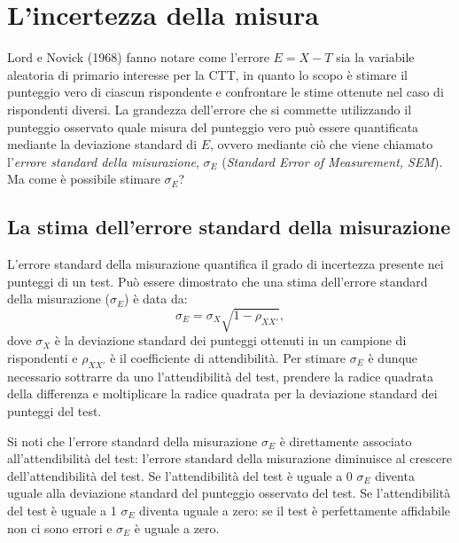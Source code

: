 \chapter{L'incertezza della misura}
\label{ch:err_stnd_mis}

Lord e Novick (1968) fanno notare come l'errore $E = X - T$ sia la variabile aleatoria di primario interesse per la CTT, in quanto lo scopo è  stimare il punteggio vero di ciascun rispondente e confrontare le stime ottenute nel caso di rispondenti diversi. 
La grandezza dell'errore che si commette utilizzando il punteggio osservato quale misura del punteggio vero può essere quantificata mediante la deviazione standard di $E$, ovvero mediante ciò che viene chiamato l'\emph{errore standard della misurazione}, $\sigma_E$  (\emph{Standard Error of Measurement, SEM}).
Ma come è possibile stimare $\sigma_E$?


\section{La stima dell'errore standard della misurazione}

L'errore standard della misurazione quantifica il grado di incertezza presente nei punteggi di un test.
Può essere dimostrato che una stima dell'errore standard della misurazione ($\sigma_E$) è data da:
\begin{equation}
\sigma_E = \sigma_X \sqrt{1 -\rho_{XX'}},
\label{eq:err_stnd_mis}
\end{equation}
dove $\sigma_X$ è la deviazione standard dei punteggi ottenuti in un campione di rispondenti e
$\rho_{XX'}$ è il coefficiente di attendibilità. 
Per stimare $\sigma_E$ è dunque necessario sottrarre da uno l'attendibilità del test, prendere la radice quadrata della differenza e moltiplicare la radice quadrata
per la deviazione standard dei punteggi del test. 

Si noti che l'errore standard della misurazione 
$
\sigma_E
$
è direttamente associato all'attendibilità del test: l'errore standard della misurazione diminuisce al crescere dell'attendibilità del test. Se l'attendibilità del test è uguale a 0 $\sigma_E$ diventa uguale alla deviazione standard del punteggio osservato del test.  Se l'attendibilità del test è uguale a 1 $\sigma_E$ diventa uguale a zero: se il test è perfettamente affidabile non ci sono errori e $\sigma_E$ è uguale a zero. 


